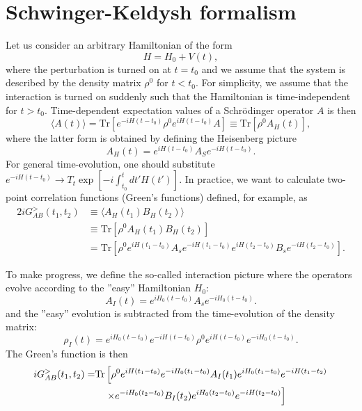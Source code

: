 \section{Schwinger-Keldysh formalism}
Let us consider an arbitrary Hamiltonian of the form
\begin{equation}
 H = H_0 + V(t),
\end{equation}
where the perturbation is turned on at $t=t_0$ and we assume that the system is described by the density matrix $\rho^0$ for $t<t_0$. For simplicity, we assume that the interaction is turned on suddenly such that the Hamiltonian is time-independent for $t>t_0$. Time-dependent expectation values of a Schr\"odinger operator $A$ is then 
\begin{equation}
  \langle A(t) \rangle = \textrm{Tr}[e^{-iH(t-t_0)} \rho^0 e^{iH(t-t_0)} A] \equiv \textrm{Tr}[\rho^0 A_H(t)],
\end{equation}
where the latter form is obtained by defining the Heisenberg picture
\begin{equation}
 A_H(t) = e^{iH(t-t_0)} A_S e^{-iH(t-t_0)}.
\end{equation}
For general time-evolution, one should substitute $e^{-iH(t-t_0)}\to T_t \exp\left[-i\int_{t_0}^t dt' H(t')\right]$. In practice, we want to calculate two-point correlation functions (Green's functions) defined, for example, as
\begin{alignat}{2}
 iG^{>}_{AB}(t_1,t_2) &\equiv \langle A_H(t_1) B_H(t_2) \rangle \\
  &\equiv \textrm{Tr}[\rho^0 A_H(t_1) B_H(t_2)] \\
  &= \textrm{Tr}[\rho^0 e^{iH(t_1-t_0)} A_s e^{-iH(t_1-t_0)} e^{iH(t_2-t_0)} B_s e^{-iH(t_2-t_0)} ].
\end{alignat}

To make progress, we define the so-called interaction picture where the operators evolve according to the ''easy'' Hamiltonian $H_0$:
\begin{equation}
 A_I(t) = e^{iH_0(t-t_0)} A_s e^{-iH_0(t-t_0)}.
\end{equation}
and the ''easy'' evolution is subtracted from the time-evolution of the density matrix:
\begin{equation}
 \rho_I(t) = e^{iH_0 (t-t_0)} e^{-iH(t-t_0)} \rho^0 e^{iH(t-t_0)}e^{-iH_0 (t-t_0)}.
\end{equation}
The Green's function is then
\begin{alignat}{2}
  iG^{>}_{AB}(t_1,t_2) = &\textrm{Tr}\left[\rho^0 e^{iH(t_1-t_0)} e^{-iH_0(t_1-t_0)} A_I(t_1) e^{iH_0(t_1-t_0)}e^{-iH(t_1-t_2)} \right.\notag \\
   &\quad  \left.\times e^{-iH_0(t_2-t_0)} B_I(t_2) e^{iH_0(t_2-t_0)} e^{-iH(t_2-t_0)} \right] 
\end{alignat}

